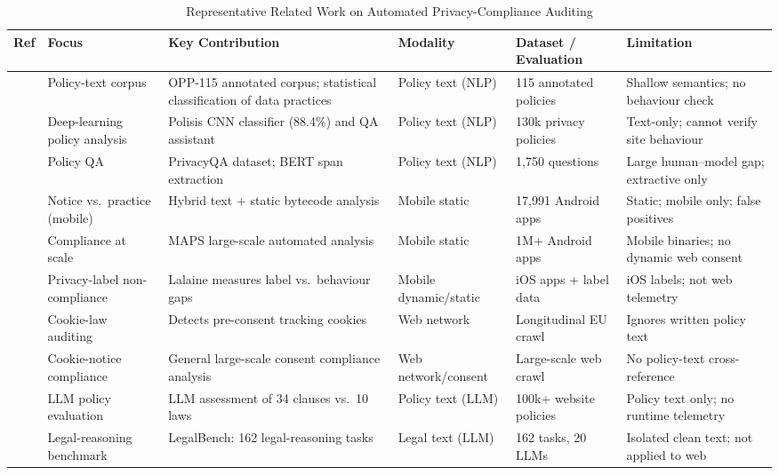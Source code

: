 \documentclass[conference]{IEEEtran}
\begin{document}
\begin{table}[!t]
\centering
\caption{Representative Related Work on Automated Privacy-Compliance Auditing}
\label{tab:related_work}
\footnotesize
\begin{tabular}{P{0.9cm} P{2.3cm} P{3.6cm} P{2.0cm} P{2.4cm} P{2.6cm}}
\toprule
\textbf{Ref} & \textbf{Focus} & \textbf{Key Contribution} & \textbf{Modality} & \textbf{Dataset / Evaluation} & \textbf{Limitation} \\
\midrule
\cite{wilson-2016-opp115} & Policy-text corpus & OPP-115 annotated corpus; statistical classification of data practices & Policy text (NLP) & 115 annotated policies & Shallow semantics; no behaviour check \\
\cite{harkous-2018-polisis} & Deep-learning policy analysis & Polisis CNN classifier (88.4\%) and QA assistant & Policy text (NLP) & 130k privacy policies & Text-only; cannot verify site behaviour \\
\cite{ravichander-2019-privacyqa} & Policy QA & PrivacyQA dataset; BERT span extraction & Policy text (NLP) & 1{,}750 questions & Large human--model gap; extractive only \\
\cite{zimmeck-2017-mobileapps} & Notice vs.\ practice (mobile) & Hybrid text + static bytecode analysis & Mobile static & 17{,}991 Android apps & Static; mobile only; false positives \\
\cite{zimmeck-2019-maps} & Compliance at scale & MAPS large-scale automated analysis & Mobile static & 1M+ Android apps & Mobile binaries; no dynamic web consent \\
\cite{xiao-2023-lalaine} & Privacy-label non-compliance & Lalaine measures label vs.\ behaviour gaps & Mobile dynamic/static & iOS apps + label data & iOS labels; not web telemetry \\
\cite{trevisan-2019-cookielaw} & Cookie-law auditing & Detects pre-consent tracking cookies & Web network & Longitudinal EU crawl & Ignores written policy text \\
\cite{bouhoula-2024-cookies} & Cookie-notice compliance & General large-scale consent compliance analysis & Web network/consent & Large-scale web crawl & No policy-text cross-reference \\
\cite{xie-2025-llmpolicy} & LLM policy evaluation & LLM assessment of 34 clauses vs.\ 10 laws & Policy text (LLM) & 100k+ website policies & Policy text only; no runtime telemetry \\
\cite{guha-2023-legalbench} & Legal-reasoning benchmark & LegalBench: 162 legal-reasoning tasks & Legal text (LLM) & 162 tasks, 20 LLMs & Isolated clean text; not applied to web \\
\bottomrule
\end{tabular}
\end{table}
\end{document}
